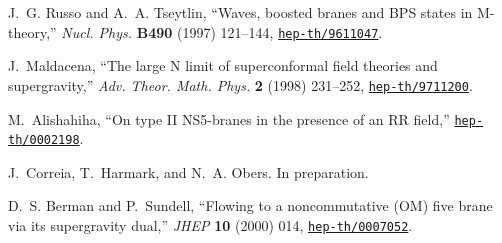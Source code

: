 \documentclass[a4paper,twoside,titlepage,12pt]{article}
\begin{document}
\begin{thebibliography}{10}
J.~G. Russo and A.~A. Tseytlin, ``Waves, boosted branes and {BPS} states in
  {M}-theory,'' {\em Nucl. Phys.} {\bf B490} (1997) 121--144,
  \href{http://xxx.lanl.gov/abs/hep-th/9611047}{{\tt hep-th/9611047}}.

J.~Maldacena, ``The large {N} limit of superconformal field theories and
  supergravity,'' {\em Adv. Theor. Math. Phys.} {\bf 2} (1998) 231--252,
  \href{http://xxx.lanl.gov/abs/hep-th/9711200}{{\tt hep-th/9711200}}.

M.~Alishahiha, ``On type {II} {NS5-branes} in the presence of an {RR} field,''
  \href{http://xxx.lanl.gov/abs/hep-th/0002198}{{\tt hep-th/0002198}}.

J.~Correia, T.~Harmark, and N.~A. Obers. In preparation.

D.~S. Berman and P.~Sundell, ``Flowing to a noncommutative {(OM)} five brane
  via its supergravity dual,'' {\em JHEP} {\bf 10} (2000) 014,
  \href{http://xxx.lanl.gov/abs/hep-th/0007052}{{\tt hep-th/0007052}}.

\end{thebibliography}\endgroup
\end{document}
